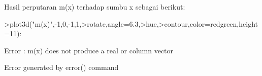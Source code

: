 \documentclass[a4paper,10pt]{article}
\begin{document}
\begin{eulernotebook}
\begin{eulercomment}
\begin{eulercomment}
\begin{eulercomment}
\begin{eulercomment}
\begin{eulercomment}
\begin{eulercomment}
\begin{eulercomment}
\begin{eulercomment}
\begin{eulercomment}
Hasil perputaran m(x) terhadap sumbu x sebagai berikut:
\end{eulercomment}
\begin{eulerprompt}
>plot3d("m(x)",-1,0,-1,1,>rotate,angle=6.3,>hue,>contour,color=redgreen,height=11):
\end{eulerprompt}
\begin{euleroutput}
  Error : m(x) does not produce a real or column vector
  
  Error generated by error() command
  

\end{euleroutput}
\end{eulercomment}
\end{eulercomment}
\end{eulercomment}
\end{eulercomment}
\end{eulercomment}
\end{eulercomment}
\end{eulercomment}
\end{eulercomment}
\end{eulernotebook}
\end{document}
